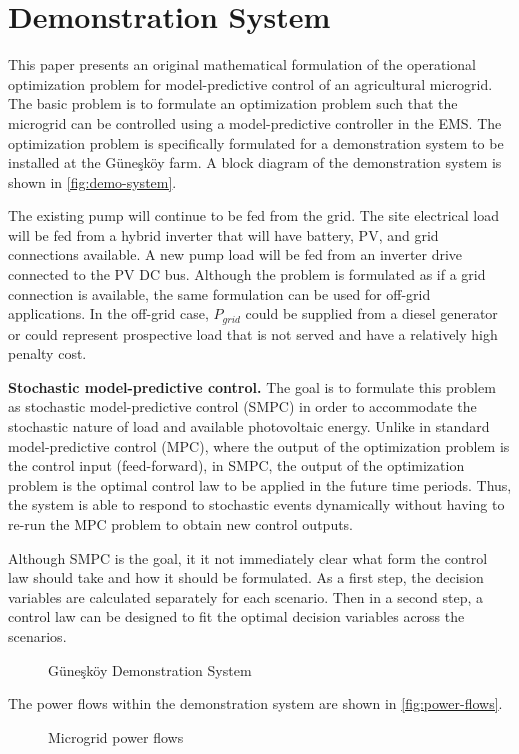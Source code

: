 \FloatBarrier

\section{Demonstration System}
\label{sec:demo-system}

This paper presents an original mathematical formulation of the operational optimization problem for model-predictive control of an agricultural microgrid. The basic problem is to formulate an optimization problem such that the microgrid can be controlled using a model-predictive controller in the EMS. The optimization problem is specifically formulated for a demonstration system to be installed at the Güneşköy farm\cite{Guneskoy}. A block diagram of the demonstration system is shown in \autoref{fig:demo-system}.

The existing pump will continue to be fed from the grid. The site electrical load will be fed from a hybrid inverter that will have battery, PV, and grid connections available. A new pump load will be fed from an inverter drive connected to the PV DC bus. Although the problem is formulated as if a grid connection is available, the same formulation can be used for off-grid applications. In the off-grid case, $P_{grid}$ could be supplied from a diesel generator or could represent prospective load that is not served and have a relatively high penalty cost.

\textbf{Stochastic model-predictive control.} The goal is to formulate this problem as stochastic model-predictive control (SMPC) in order to accommodate the stochastic nature of load and available photovoltaic energy. Unlike in standard model-predictive control (MPC), where the output of the optimization problem is the control input (feed-forward), in SMPC, the output of the optimization problem is the optimal control law to be applied in the future time periods. Thus, the system is able to respond to stochastic events dynamically without having to re-run the MPC problem to obtain new control outputs.

Although SMPC is the goal, it it not immediately clear what form the control law should take and how it should be formulated. As a first step, the decision variables are calculated separately for each scenario. Then in a second step, a control law can be designed to fit the optimal decision variables across the scenarios.

\begin{figure}
	\centering
	\fontsize{8pt}{9.5pt}\selectfont
	\def\svgwidth{\columnwidth}
	
	\caption{Güneşköy Demonstration System}
	\label{fig:demo-system}
\end{figure}

The power flows within the demonstration system are shown in \autoref{fig:power-flows}.

\begin{figure}
	\centering
	
	\caption{Microgrid power flows}
	\label{fig:power-flows}
\end{figure}





